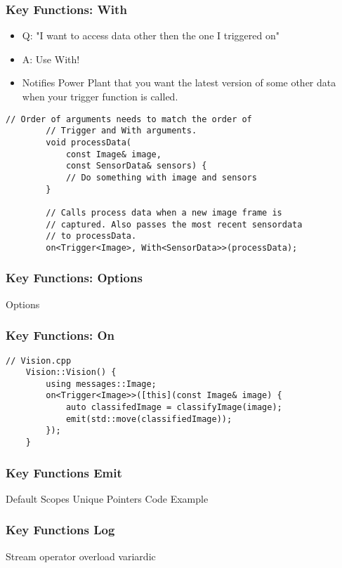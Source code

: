 \documentclass{beamer}
\begin{document}
\begin{frame}[fragile]
	\frametitle {Key Functions: With}
	\begin{itemize}
		\item Q: "I want to access data other then the one I triggered on"
		\item A: Use With!
		\item Notifies Power Plant that you want the latest version of some other data when your trigger function is called.
	\end{itemize}

	\begin{lstlisting}[language=nuclear]
		// Order of arguments needs to match the order of 
		// Trigger and With arguments.
		void processData(
			const Image& image,
			const SensorData& sensors) {
			// Do something with image and sensors
		}

		// Calls process data when a new image frame is 
		// captured. Also passes the most recent sensordata
		// to processData.
		on<Trigger<Image>, With<SensorData>>(processData);
	\end{lstlisting}
\end{frame}

\begin{frame}
	\frametitle {Key Functions: Options}
\end{frame}

\begin{frame}
	Options
\end{frame}

\begin{frame}[fragile]
	\frametitle{Key Functions: On}
	\begin{lstlisting}[language=nuclear]
	// Vision.cpp
	Vision::Vision() {
		using messages::Image;
		on<Trigger<Image>>([this](const Image& image) {
			auto classifedImage = classifyImage(image);
			emit(std::move(classifiedImage));
		});
	}
	\end{lstlisting}
\end{frame}

\begin{frame}
	\frametitle{Key Functions Emit}
	Default
	Scopes
	Unique Pointers
	Code Example
\end{frame}

\begin{frame}
	\frametitle{Key Functions Log}
	Stream operator overload
	variardic
\end{frame}
\end{document}
